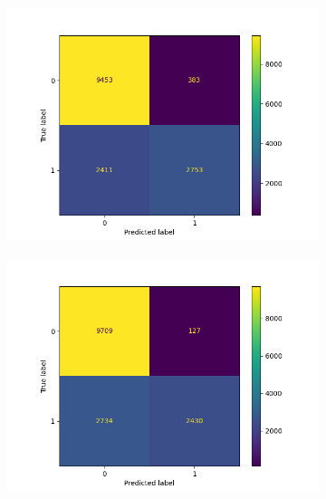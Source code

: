 \begin{figure}
        \hspace{-2cm}
        \begin{subfigure}[b]{0.245\textwidth}  
            \centering 
            \includegraphics[scale=0.35]{"../figs/fig_content_title/fig_KNN_7_content_title.png"}
            \caption{}
        \end{subfigure}
        \begin{subfigure}[b]{0.245\textwidth}  
            \centering 
            \includegraphics[scale=0.35]{"../figs/fig_content_title/fig_KNN_10_content_title.png"}
            \caption{}
        \end{subfigure}
        \begin{subfigure}[b]{0.245\textwidth}  

\end{subfigure}
\end{figure}
